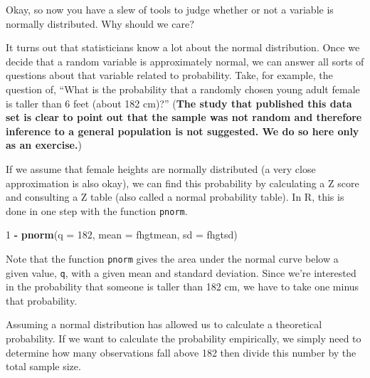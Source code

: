 \documentclass[]{book}
\newenvironment{Shaded}{\begin{snugshade}}{\end{snugshade}}
\newcommand{\DataTypeTok}[1]{\textcolor[rgb]{0.13,0.29,0.53}{#1}}
\newcommand{\DecValTok}[1]{\textcolor[rgb]{0.00,0.00,0.81}{#1}}
\newcommand{\KeywordTok}[1]{\textcolor[rgb]{0.13,0.29,0.53}{\textbf{#1}}}
\newcommand{\NormalTok}[1]{#1}
\newcommand{\OperatorTok}[1]{\textcolor[rgb]{0.81,0.36,0.00}{\textbf{#1}}}
\newcommand{\StringTok}[1]{\textcolor[rgb]{0.31,0.60,0.02}{#1}}
\theoremstyle{definition}
\theoremstyle{definition}
\theoremstyle{definition}
\theoremstyle{remark}
\begin{document}
Okay, so now you have a slew of tools to judge whether or not a variable
is normally distributed. Why should we care?

It turns out that statisticians know a lot about the normal
distribution. Once we decide that a random variable is approximately
normal, we can answer all sorts of questions about that variable related
to probability. Take, for example, the question of, ``What is the
probability that a randomly chosen young adult female is taller than 6
feet (about 182 cm)?'' (\textbf{The study that published this data set
is clear to point out that the sample was not random and therefore
inference to a general population is not suggested. We do so here only
as an exercise.})

If we assume that female heights are normally distributed (a very close
approximation is also okay), we can find this probability by calculating
a Z score and consulting a Z table (also called a normal probability
table). In R, this is done in one step with the function \texttt{pnorm}.

\begin{Shaded}
\begin{Highlighting}[]
\DecValTok{1} \OperatorTok{-}\StringTok{ }\KeywordTok{pnorm}\NormalTok{(}\DataTypeTok{q =} \DecValTok{182}\NormalTok{, }\DataTypeTok{mean =}\NormalTok{ fhgtmean, }\DataTypeTok{sd =}\NormalTok{ fhgtsd)}
\end{Highlighting}
\end{Shaded}

Note that the function \texttt{pnorm} gives the area under the normal
curve below a given value, \texttt{q}, with a given mean and standard
deviation. Since we're interested in the probability that someone is
taller than 182 cm, we have to take one minus that probability.

Assuming a normal distribution has allowed us to calculate a theoretical
probability. If we want to calculate the probability empirically, we
simply need to determine how many observations fall above 182 then
divide this number by the total sample size.

\begin{Shaded}
\end{Shaded}
\end{document}
